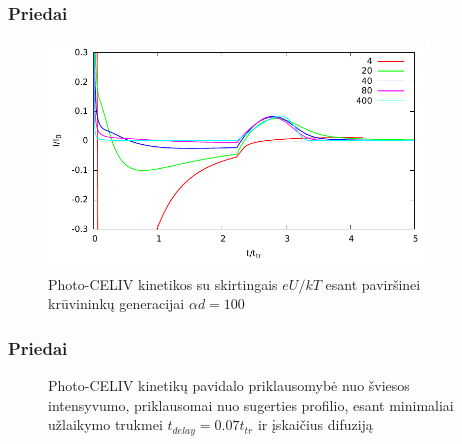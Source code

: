 \documentclass{beamer}
\begin{document}
  \begin{frame}
  \frametitle{Priedai}
  \begin{figure}
  \centering
    \includegraphics[width=0.9\textwidth]{./media/pdf/diff_drift.pdf}
  \caption{Photo-CELIV kinetikos su skirtingais $eU/kT$ esant paviršinei krūvininkų generacijai $\alpha d = 100$}
\end{figure}
  \end{frame}

\begin{frame}
\frametitle{Priedai}
\begin{figure}
    \centering
  \caption{Photo-CELIV kinetikų pavidalo priklausomybė nuo šviesos intensyvumo, priklausomai nuo sugerties profilio, esant minimaliai užlaikymo trukmei $t_{delay} = 0.07t_{tr}$ ir įskaičius difuziją}
\end{figure}
\end{frame}
\end{document}
